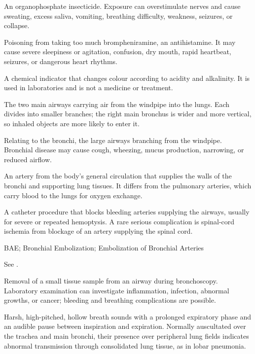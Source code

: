  An organophosphate insecticide. Exposure can overstimulate nerves and cause sweating, excess saliva, vomiting, breathing difficulty, weakness, seizures, or collapse.

 Poisoning from taking too much brompheniramine, an antihistamine. It may cause severe sleepiness or agitation, confusion, dry mouth, rapid heartbeat, seizures, or dangerous heart rhythms.

 A chemical indicator that changes colour according to acidity and alkalinity. It is used in laboratories and is not a medicine or treatment.

 The two main airways carrying air from the windpipe into the lungs. Each divides into smaller branches; the right main bronchus is wider and more vertical, so inhaled objects are more likely to enter it.

 Relating to the bronchi, the large airways branching from the windpipe. Bronchial disease may cause cough, wheezing, mucus production, narrowing, or reduced airflow.

 An artery from the body's general circulation that supplies the walls of the bronchi and supporting lung tissues. It differs from the pulmonary arteries, which carry blood to the lungs for oxygen exchange.

 A catheter procedure that blocks
bleeding arteries supplying the airways, usually for severe or repeated
hemoptysis. A rare serious complication is spinal-cord ischemia from blockage
of an artery supplying the spinal cord.

\synonyms
BAE; Bronchial Embolization; Embolization of Bronchial Arteries

 See .

 Removal of a small tissue sample from an airway during bronchoscopy. Laboratory examination can investigate inflammation, infection, abnormal growths, or cancer; bleeding and breathing complications are possible.

 Harsh, high-pitched, hollow breath sounds with a prolonged expiratory phase and an audible pause between inspiration and expiration. Normally auscultated over the trachea and main bronchi, their presence over peripheral lung fields indicates abnormal transmission through consolidated lung tissue, as in lobar pneumonia.

